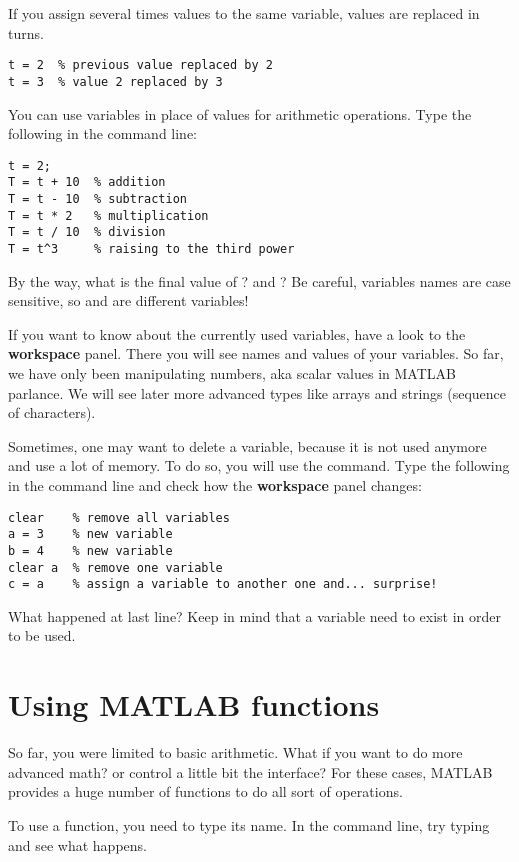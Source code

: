 \documentclass{article}
\begin{document}
If you assign several times values to the same variable, values are replaced in turns.
\begin{lstlisting}
t = 2  % previous value replaced by 2
t = 3  % value 2 replaced by 3
\end{lstlisting}

You can use variables in place of values for arithmetic operations.
Type the following in the command line:
\begin{lstlisting}
t = 2;
T = t + 10  % addition
T = t - 10  % subtraction
T = t * 2   % multiplication
T = t / 10  % division
T = t^3     % raising to the third power
\end{lstlisting}

By the way, what is the final value of ? and ?
Be careful, variables names are case sensitive, so  and  are different variables!

If you want to know about the currently used variables, have a look to the \textbf{workspace} panel.
There you will see names and values of your variables.
So far, we have only been manipulating numbers, aka scalar values in MATLAB parlance.
We will see later more advanced types like arrays and strings (sequence of characters).

Sometimes, one may want to delete a variable, because it is not used anymore and use a lot of memory.
To do so, you will use the  command.
Type the following in the command line and check how the \textbf{workspace} panel changes:
\begin{lstlisting}
clear    % remove all variables
a = 3    % new variable
b = 4    % new variable
clear a  % remove one variable
c = a    % assign a variable to another one and... surprise!
\end{lstlisting}
What happened at last line? Keep in mind that a variable need to exist in order to be used.


\section{Using MATLAB functions}

So far, you were limited to basic arithmetic.
What if you want to do more advanced math? or control a little bit the interface?
For these cases, MATLAB provides a huge number of functions to do all sort of operations.

To use a function, you need to type its name.
In the command line, try typing  and see what happens.
\end{document}
